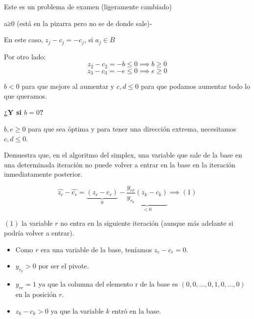 \begin{problem}[7]

Este es un problema de examen (ligeramente cambiado)


\solution

a≥0 (está en la pizarra pero no se de donde sale)-

\spart

En este caso, $z_j - c_j = -c_j$, si $a_j∈B$

Por otro lado:
\[ z_2 - c_2 = -b ≤ 0 \implies b≥0\]
\[ z_3 - c_3 = -e ≤ 0 \implies e≥0\]

\spart $b<0$ para que mejore al aumentar y $c,d≤0$ para que podamos aumentar todo lo que queramos.

\textbf{¿Y si $b=0$?}

\spart $b,e≥0$ para que sea óptima y para tener una dirección extrema, necesitamos $c,d≤0$.

\end{problem}

\begin{problem}[8]
Demuestra que, en el algoritmo del simplex, una variable que sale de la base en una determinada
iteración no puede volver a entrar en la base en la iteración inmediatamente posterior.
\solution

\[\hat{z_r} - \hat{c_r} = \underbrace{(z_r - c_r)}_{0} - \underbrace{\frac{y_{rr}}{y_{r_k}} (z_k - c_k)}_{<0}\implies (1)\]

$(1)$  la variable $r$ no entra en la siguiente iteración (aunque más adelante si podría volver a entrar).

\begin{itemize}
\item Como $r$ era una variable de la base, teníamos $z_r - c_r = 0$.
\item $y_{r_k} > 0$ por ser el pivote.
\item $y_{rr} = 1$ ya que la columna del elemento r de la base es $(0,0,...,0,1,0,...,0)$ en la posición $r$.
\item $z_k - c_k > 0$ ya que la variable $k$ entró en la base.
\end{itemize}

\end{problem}

